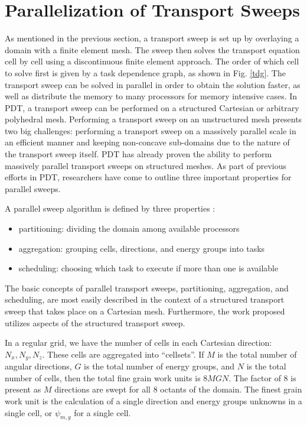 \documentclass[11pt, letterpaper,titlepage,oneside]{article}
\begin{document}
\section{Parallelization of Transport Sweeps}

As mentioned in the previous section, a transport sweep is set up by overlaying a domain with a finite element mesh. The sweep then solves the transport equation cell by cell using a discontinuous finite element approach. The order of which cell to solve first is given by a task dependence graph, as shown in Fig. \ref{tdg}. The transport sweep can be solved in parallel in order to obtain the solution faster, as well as distribute the memory to many processors for memory intensive cases. In PDT, a transport sweep can be performed on a structured Cartesian or arbitrary polyhedral mesh. Performing a transport sweep on an unstructured mesh presents two big challenges: performing a transport sweep on a massively parallel scale in an efficient manner and keeping non-concave sub-domains due to the nature of the transport sweep itself. PDT has already proven the ability to perform massively parallel transport sweeps on structured meshes. As part of previous efforts in PDT, researchers have come to outline three important properties for parallel sweeps. 

A parallel sweep algorithm is defined by three properties\cite{mpadams2013} :
\begin{itemize}
\item partitioning: dividing the domain among available processors
\item aggregation: grouping cells, directions, and energy groups into tasks
\item scheduling: choosing which task to execute if more than one is available
\end{itemize}

The basic concepts of parallel transport sweeps, partitioning, aggregation, and scheduling, are most easily described in the context of a structured transport sweep that takes place on a Cartesian mesh. Furthermore, the work proposed utilizes aspects of the structured transport sweep.

In a regular grid, we have the  number of cells in each Cartesian direction: $N_x, N_y, N_z$. These cells are aggregated into ``cellsets''. If $M$ is the total number of angular directions, $G$ is the total number of energy groups, and $N$ is the total number of cells, then the total fine grain work units is $8MGN$. The factor of 8 is present as $M$ directions are swept for all 8 octants of the domain. The finest grain work unit is the calculation of a single direction and energy groups unknowns in a single cell, or $\psi_{m,g}$ for a single cell.
\end{document}
